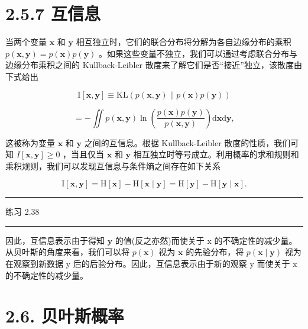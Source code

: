 \documentclass[10pt]{article}
\newcommand{\HRule}{\begin{center}\rule{0.9\linewidth}{0.2mm}\end{center}}
\begin{document}
\section*{2.5.7 互信息}

当两个变量 \(\mathbf{x}\) 和 \(\mathbf{y}\) 相互独立时，它们的联合分布将分解为各自边缘分布的乘积 \(p\left( {\mathbf{x},\mathbf{y}}\right)  = p\left( \mathbf{x}\right) p\left( \mathbf{y}\right)\) 。如果这些变量不独立，我们可以通过考虑联合分布与边缘分布乘积之间的 Kullback-Leibler 散度来了解它们是否“接近”独立，该散度由下式给出

\[
\mathrm{I}\left\lbrack  {\mathbf{x},\mathbf{y}}\right\rbrack   \equiv  \mathrm{{KL}}\left( {p\left( {\mathbf{x},\mathbf{y}}\right) \parallel p\left( \mathbf{x}\right) p\left( \mathbf{y}\right) }\right)
\]

\[
=  - \iint p\left( {\mathbf{x},\mathbf{y}}\right) \ln \left( \frac{p\left( \mathbf{x}\right) p\left( \mathbf{y}\right) }{p\left( {\mathbf{x},\mathbf{y}}\right) }\right) \mathrm{d}\mathbf{x}\mathrm{d}\mathbf{y}, \tag{2.109}
\]

这被称为变量 \(\mathbf{x}\) 和 \(\mathbf{y}\) 之间的互信息。根据 Kullback-Leibler 散度的性质，我们可知 \(I\left\lbrack  {\mathbf{x},\mathbf{y}}\right\rbrack   \geq  0\) ，当且仅当 \(\mathbf{x}\) 和 \(\mathbf{y}\) 相互独立时等号成立。利用概率的求和规则和乘积规则，我们可以发现互信息与条件熵之间存在如下关系

\[
\mathrm{I}\left\lbrack  {\mathbf{x},\mathbf{y}}\right\rbrack   = \mathrm{H}\left\lbrack  \mathbf{x}\right\rbrack   - \mathrm{H}\left\lbrack  {\mathbf{x} \mid  \mathbf{y}}\right\rbrack   = \mathrm{H}\left\lbrack  \mathbf{y}\right\rbrack   - \mathrm{H}\left\lbrack  {\mathbf{y} \mid  \mathbf{x}}\right\rbrack  . \tag{2.110}
\]

\HRule

练习 2.38

\HRule

因此，互信息表示由于得知 \(\mathbf{y}\) 的值(反之亦然)而使关于 \(\mathrm{x}\) 的不确定性的减少量。从贝叶斯的角度来看，我们可以将 \(p\left( \mathbf{x}\right)\) 视为 \(\mathbf{x}\) 的先验分布，将 \(p\left( {\mathbf{x} \mid  \mathbf{y}}\right)\) 视为在观察到新数据 y 后的后验分布。因此，互信息表示由于新的观察 \(\mathrm{y}\) 而使关于 \(\mathrm{x}\) 的不确定性的减少量。

\section*{2.6. 贝叶斯概率}
\end{document}
